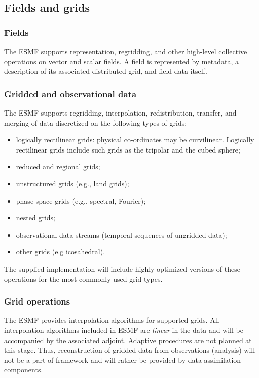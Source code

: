 \subsection{Fields and grids}

\subsubsection{Fields}
The ESMF supports representation, regridding, and other high-level
collective operations on vector and scalar fields.  A field is represented 
by metadata, a description of its associated distributed grid, and field 
data itself.

\subsubsection{Gridded and observational data}

The ESMF supports regridding, interpolation, redistribution,
transfer, and merging of data discretized on the following types of grids:

\begin{itemize}
\item logically rectilinear grids: physical co-ordinates may be
  curvilinear. Logically rectilinear grids include such grids as the
  tripolar and the cubed sphere;
\item reduced and regional grids;
\item unstructured grids (e.g., land grids);
\item phase space grids (e.g., spectral, Fourier);
\item nested grids;
\item observational data streams (temporal sequences of ungridded data);
\item other grids (e.g icosahedral).
\end{itemize}

The supplied implementation will include highly-optimized versions of
these operations for the most commonly-used grid types.

\subsubsection{Grid operations}

The ESMF provides interpolation algorithms for supported grids.  All
interpolation algorithms included in ESMF are {\it linear} in the data
and will be accompanied by the associated adjoint.  Adaptive
procedures are not planned at this stage. Thus, reconstruction of
gridded data from observations (analysis) will not be a part of
framework and will rather be provided by data assimilation components.

